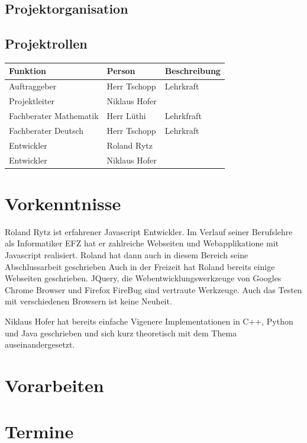 \documentclass[11pt,paper=a4,final]{scrartcl}
\begin{document}
\subsection{Projektorganisation}
\subsection{Projektrollen}
\begin{table}[h!]
  \centering
  \begin{tabular}{|l|l|l|}
    \hline
    \bf Funktion & \bf Person & \bf Beschreibung \\ \hline
    Auftraggeber & Herr Tschopp & Lehrkraft \\ \hline
    Projektleiter & Niklaus Hofer & \\ \hline
    Fachberater Mathematik & Herr L\"uthi & Lehrkfraft \\ \hline
    Fachberater Deutsch & Herr Tschopp & Lehrkraft \\ \hline
    Entwickler & Roland Rytz & \\ \hline
    Entwickler & Niklaus Hofer & \\ \hline
  \end{tabular}
\end{table}
\section{Vorkenntnisse}
Roland Rytz ist erfahrener Javascript Entwickler. Im Verlauf seiner Berufslehre
als Informatiker EFZ hat er zahlreiche Webseiten und Webapplikatione mit
Javascript realisiert. Roland hat dann auch in diesem Bereich seine
Abschlussarbeit geschrieben Auch in der Freizeit hat Roland bereits einige
Webseiten geschrieben. JQuery, die Webentwicklungswerkzeuge von Googles Chrome
Browser und Firefox FireBug sind vertraute Werkzeuge. Auch das Testen mit
verschiedenen Browsern ist keine Neuheit.

Niklaus Hofer hat bereits einfache Vigenere Implementationen in C++, Python und
Java geschrieben und sich kurz theoretisch mit dem Thema auseinandergesetzt.

\section{Vorarbeiten}
\section{Termine}
\end{document}
